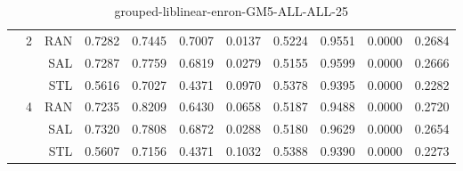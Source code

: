 \begin{center}
\begin{table}[htbp]
\begin{center}
\begin{tabular}{ | r | r | r | r | r | r | r | r | r | r | r |}
 & \multirow{3}{*}{2} & RAN & 0.7282 & 0.7445 & 0.7007 & 0.0137 & 0.5224 & 0.9551 & 0.0000 & 0.2684\\ \cline{3-11}
 &   & SAL & 0.7287 & 0.7759 & 0.6819 & 0.0279 & 0.5155 & 0.9599 & 0.0000 & 0.2666\\ \cline{3-11}
 &   & STL & 0.5616 & 0.7027 & 0.4371 & 0.0970 & 0.5378 & 0.9395 & 0.0000 & 0.2282\\ \cline{2-11}
 & \multirow{3}{*}{4} & RAN & 0.7235 & 0.8209 & 0.6430 & 0.0658 & 0.5187 & 0.9488 & 0.0000 & 0.2720\\ \cline{3-11}
 &   & SAL & 0.7320 & 0.7808 & 0.6872 & 0.0288 & 0.5180 & 0.9629 & 0.0000 & 0.2654\\ \cline{3-11}
 &   & STL & 0.5607 & 0.7156 & 0.4371 & 0.1032 & 0.5388 & 0.9390 & 0.0000 & 0.2273\\ \cline{2-11}
\hline
\end{tabular}
\caption{grouped-liblinear-enron-GM5-ALL-ALL-25}
\end{center}
 \end{table}
\end{center}

